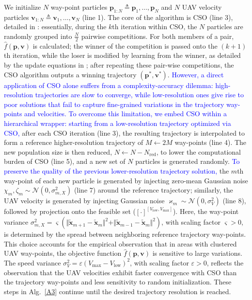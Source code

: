 \documentclass[12pt, draftcls, onecolumn]{IEEEtran}
\theoremstyle{plain}
\theoremstyle{definition}
\theoremstyle{remark}
\newcommand\hlt[1]{\textcolor{blue}{#1}}
\begin{document}
We initialize $N$ way-point particles $\mathbf{p}_{1:N}{\triangleq}\mathbf{p}_{1},{\dots},\mathbf{p}_{N}$ and $N$ UAV velocity particles $\mathbf{v}_{1:N}\triangleq\mathbf{v}_{1},\dots,\mathbf{v}_{N}$ (line 1). The core of the algorithm is CSO (line 3), detailed in \cite{CSO}: essentially, during the $k$th iteration within CSO, the  $N$ particles are randomly grouped into $\frac{N}{2}$ pairwise competitions. For both members of a pair, $\hat{f}(\mathbf{p},\mathbf{v})$ is calculated; the winner of the competition is passed onto the $(k{+}1)$th iteration, while the loser is modified by learning from the winner, as detailed by the update equations in \cite{CSO};
after repeating these pair-wise competitions, the CSO algorithm outputs a winning trajectory $(\mathbf{p}^*,\mathbf{v}^*)$. \label{dilemma}\hlt{However, a direct application of CSO alone suffers from a complexity-accuracy dilemma: high-resolution trajectories are slow to converge, while low-resolution ones give rise to poor solutions that fail to capture fine-grained variations in the trajectory way-points and velocities. To overcome this limitation, we embed CSO  within a hierarchical wrapper: starting from a low-resolution trajectory optimized via CSO,}
after each CSO iteration (line 3), the resulting trajectory is interpolated to form a reference higher-resolution trajectory of $M{\gets}2M$ way-points (line 4). The new population size is then reduced, $N{\gets}N{-}N_{\mathrm{red}}$, to lower the computational burden of CSO (line 5), and a new set of $N$ particles is generated randomly. \hlt{To preserve the quality of the previous lower-resolution trajectory solution,} the $m$th way-point of each new particle is generated by injecting zero-mean Gaussian noise $\chi_{m},\zeta_{m}{\sim}\mathcal{N}\left(0,\sigma_{m,X}^2\right)$ (line 7) around the reference trajectory; similarly, the UAV velocity is
generated by injecting Gaussian noise $\varkappa_{m}{\sim}\mathcal{N}(0,\sigma_V^2)$ (line 8), followed by projection onto the feasible set ($[\cdot]^{[V_{\mathrm{low}},V_{\mathrm{max}}]}$). Here, the way-point variance  $\sigma_{m,X}^2=\varsigma(\Vert\tilde{\mathbf{x}}_{m{+}1}{-}\tilde{\mathbf{x}}_{m}\Vert^{2}{+}\Vert\tilde{\mathbf{x}}_{m{-}1}{-}\tilde{\mathbf{x}}_{m}\Vert^2)$, with scaling factor $\varsigma{>}0$, is determined by the spread between neighboring reference trajectory way-points. This choice accounts for the empirical observation that in areas with clustered UAV way-points, the objective function $\hat{f}(\mathbf{p},\mathbf{v})$ is sensitive to large variations. The speed variance $\sigma_V^2=\varepsilon(V_{\mathrm{max}}{-}V_{\mathrm{low}})^{2}$, with scaling factor $\varepsilon{>}0$, reflects the observation that the UAV velocities exhibit faster convergence with CSO than the trajectory way-points and less sensitivity to random initialization. These steps in Alg.~\ref{A3} continue until the desired trajectory resolution is reached. 
\end{document}
